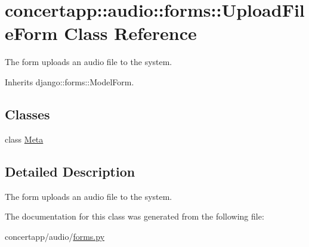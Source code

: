 \hypertarget{classconcertapp_1_1audio_1_1forms_1_1_upload_file_form}{
\section{concertapp::audio::forms::UploadFileForm Class Reference}
\label{classconcertapp_1_1audio_1_1forms_1_1_upload_file_form}
}


The form uploads an audio file to the system.  




Inherits django::forms::ModelForm.

\subsection*{Classes}
\begin{DoxyCompactItemize}
\item 
class \hyperlink{classconcertapp_1_1audio_1_1forms_1_1_upload_file_form_1_1_meta}{Meta}
\end{DoxyCompactItemize}


\subsection{Detailed Description}
The form uploads an audio file to the system. 

The documentation for this class was generated from the following file:\begin{DoxyCompactItemize}
\item 
concertapp/audio/\hyperlink{audio_2forms_8py}{forms.py}\end{DoxyCompactItemize}
